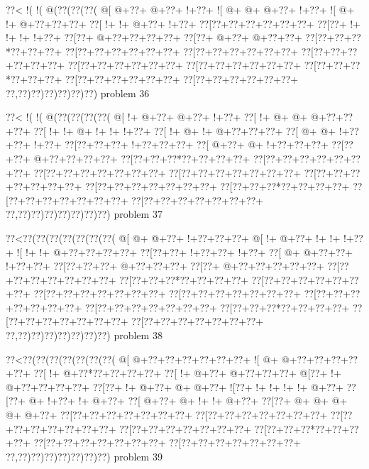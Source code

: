 \vbox{\vbox{\goo
\0??<\- !(\- !(\- @(\0??(\0??(\0??(
\- @[\- @+\0??+\- @+\0??+\- !+\0??+
\- ![\- @+\- @+\- @+\0??+\- !+\0??+
\- ![\- @+\- !+\- @+\0??+\0??+\0??+
\0??[\- !+\- !+\- @+\0??+\- !+\0??+
\0??[\0??+\0??+\0??+\0??+\0??+\0??+
\0??[\0??+\- !+\- !+\- !+\- !+\0??+
\0??[\0??+\- @+\0??+\0??+\0??+\0??+
\0??[\0??+\- @+\0??+\- @+\0??+\0??+
\0??[\0??+\0??+\0??*\0??+\0??+\0??+
\0??[\0??+\0??+\0??+\0??+\0??+\0??+
\0??[\0??+\0??+\0??+\0??+\0??+\0??+
\0??[\0??+\0??+\0??+\0??+\0??+\0??+
\0??[\0??+\0??+\0??+\0??+\0??+\0??+
\0??[\0??+\0??+\0??+\0??+\0??+\0??+
\0??[\0??+\0??+\0??*\0??+\0??+\0??+
\0??[\0??+\0??+\0??+\0??+\0??+\0??+
\0??[\0??+\0??+\0??+\0??+\0??+\0??+
\0??,\0??)\0??)\0??)\0??)\0??)\0??)
}
\hfil problem 36\hfil\break
}

\vbox{\vbox{\goo
\0??<\- !(\- !(\- @(\0??(\0??(\0??(\0??(
\- @[\- !+\- @+\0??+\- @+\0??+\- !+\0??+
\0??[\- !+\- @+\- @+\- @+\0??+\0??+\0??+
\0??[\- !+\- !+\- @+\- !+\- !+\- !+\0??+
\0??[\- !+\- @+\- !+\- @+\0??+\0??+\0??+
\0??[\- @+\- @+\- !+\0??+\0??+\- !+\0??+
\0??[\0??+\0??+\0??+\- !+\0??+\0??+\0??+
\0??[\- @+\0??+\- @+\- !+\0??+\0??+\0??+
\0??[\0??+\0??+\- @+\0??+\0??+\0??+\0??+
\0??[\0??+\0??+\0??*\0??+\0??+\0??+\0??+
\0??[\0??+\0??+\0??+\0??+\0??+\0??+\0??+
\0??[\0??+\0??+\0??+\0??+\0??+\0??+\0??+
\0??[\0??+\0??+\0??+\0??+\0??+\0??+\0??+
\0??[\0??+\0??+\0??+\0??+\0??+\0??+\0??+
\0??[\0??+\0??+\0??+\0??+\0??+\0??+\0??+
\0??[\0??+\0??+\0??*\0??+\0??+\0??+\0??+
\0??[\0??+\0??+\0??+\0??+\0??+\0??+\0??+
\0??[\0??+\0??+\0??+\0??+\0??+\0??+\0??+
\0??,\0??)\0??)\0??)\0??)\0??)\0??)\0??)
}
\hfil problem 37\hfil\break
}

\vbox{\vbox{\goo
\0??<\0??(\0??(\0??(\0??(\0??(\0??(\0??(
\- @[\- @+\- @+\0??+\- !+\0??+\0??+\0??+
\- @[\- !+\- @+\0??+\- !+\- !+\- !+\0??+
\- ![\- !+\- !+\- @+\0??+\0??+\0??+\0??+
\0??[\0??+\0??+\- !+\0??+\0??+\- !+\0??+
\0??[\- @+\- @+\0??+\0??+\- !+\0??+\0??+
\0??[\0??+\0??+\0??+\- @+\0??+\0??+\0??+
\0??[\0??+\- @+\0??+\0??+\0??+\0??+\0??+
\0??[\0??+\0??+\0??+\0??+\0??+\0??+\0??+
\0??[\0??+\0??+\0??*\0??+\0??+\0??+\0??+
\0??[\0??+\0??+\0??+\0??+\0??+\0??+\0??+
\0??[\0??+\0??+\0??+\0??+\0??+\0??+\0??+
\0??[\0??+\0??+\0??+\0??+\0??+\0??+\0??+
\0??[\0??+\0??+\0??+\0??+\0??+\0??+\0??+
\0??[\0??+\0??+\0??+\0??+\0??+\0??+\0??+
\0??[\0??+\0??+\0??*\0??+\0??+\0??+\0??+
\0??[\0??+\0??+\0??+\0??+\0??+\0??+\0??+
\0??[\0??+\0??+\0??+\0??+\0??+\0??+\0??+
\0??,\0??)\0??)\0??)\0??)\0??)\0??)\0??)
}
\hfil problem 38\hfil\break
}

\vbox{\vbox{\goo
\0??<\0??(\0??(\0??(\0??(\0??(\0??(\0??(
\- @[\- @+\0??+\0??+\0??+\0??+\0??+\0??+
\- ![\- @+\- @+\0??+\0??+\0??+\0??+\0??+
\0??[\- !+\- @+\0??*\0??+\0??+\0??+\0??+
\0??[\- !+\- @+\0??+\- @+\0??+\0??+\0??+
\- @[\0??+\- !+\- @+\0??+\0??+\0??+\0??+
\0??[\0??+\- !+\- @+\0??+\- @+\- @+\0??+
\- ![\0??+\- !+\- !+\- !+\- !+\- @+\0??+
\0??[\0??+\- @+\- !+\0??+\- !+\- @+\0??+
\0??[\- @+\0??+\- @+\- !+\- !+\- @+\0??+
\0??[\0??+\- @+\- @+\- @+\- @+\- @+\0??+
\0??[\0??+\0??+\0??+\0??+\0??+\0??+\0??+
\0??[\0??+\0??+\0??+\0??+\0??+\0??+\0??+
\0??[\0??+\0??+\0??+\0??+\0??+\0??+\0??+
\0??[\0??+\0??+\0??+\0??+\0??+\0??+\0??+
\0??[\0??+\0??+\0??*\0??+\0??+\0??+\0??+
\0??[\0??+\0??+\0??+\0??+\0??+\0??+\0??+
\0??[\0??+\0??+\0??+\0??+\0??+\0??+\0??+
\0??,\0??)\0??)\0??)\0??)\0??)\0??)\0??)
}
\hfil problem 39\hfil\break
}

